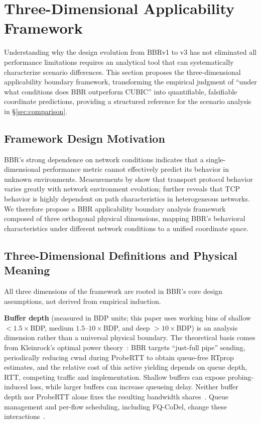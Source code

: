 \documentclass[a4paper,fleqn]{cas-sc}
\begin{document}
\FloatBarrier

\section{Three-Dimensional Applicability Framework}
\label{sec:framework}

Understanding why the design evolution from BBRv1 to v3 has not eliminated all
performance limitations requires an analytical tool that can systematically
characterize scenario differences. This section proposes the three-dimensional
applicability boundary framework, transforming the empirical judgment of ``under
what conditions does BBR outperform CUBIC'' into quantifiable, falsifiable
coordinate predictions, providing a structured reference for the scenario
analysis in \S\ref{sec:comparison}.

\subsection{Framework Design Motivation}

BBR's strong dependence on network conditions indicates that a single-dimensional
performance metric cannot effectively predict its behavior in unknown environments.
Measurements by \citet{medina2004transport} show that transport protocol behavior
varies greatly with network environment evolution; \citet{barakat2000tcp} further
reveals that TCP behavior is highly dependent on path characteristics in
heterogeneous networks. We therefore propose a BBR applicability boundary
analysis framework composed of three orthogonal physical dimensions, mapping BBR's
behavioral characteristics under different network conditions to a unified
coordinate space.

\subsection{Three-Dimensional Definitions and Physical Meaning}
\label{sec:framework_dim}

All three dimensions of the framework are rooted in BBR's core design
assumptions, not derived from empirical induction.

\textbf{Buffer depth} (measured in BDP units; this paper uses working bins of
shallow $<1.5\times$BDP, medium $1.5$--$10\times$BDP, and deep $>10\times$BDP)
is an analysis dimension rather than a universal physical boundary. The theoretical
basis comes from Kleinrock's optimal power theory~\citep{kleinrock1979power}: BBR
targets ``just-full pipe'' sending, periodically reducing cwnd during ProbeRTT to
obtain queue-free RTprop estimates, and the relative cost of this active
yielding depends on queue depth, RTT, competing traffic and implementation.
Shallow buffers can expose probing-induced loss, while larger buffers can
increase queueing delay. Neither buffer depth nor ProbeRTT alone fixes the
resulting bandwidth shares~\citep{appenzeller2004sizing,dhamdhere2006buffer,wischik2005buffers}.
Queue management and per-flow scheduling, including FQ-CoDel,
change these interactions~\citep{hoeiland2018fq}.
\end{document}
